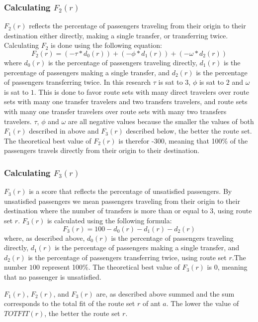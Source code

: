 \subsubsection*{Calculating $F_{2}(r)$}
\label{sec:f2}
$F_{2}(r)$ reflects the percentage of passengers traveling from their origin to their destination either directly, making a single transfer, or transferring twice. Calculating $F_{2}$ is done using the following equation: 
\newline
$$F_2(r) = (-\tau*d_0(r)) + (-\phi*d_1(r)) + (-\omega*d_2(r))$$
\newline
where $d_0(r)$ is the percentage of passengers traveling directly, $d_1(r)$ is the percentage of passengers making a single transfer, and $d_2(r)$ is the percentage of passengers transferring twice. In this research $\tau$ is sat to $3$, $\phi$ is sat to $2$ and $\omega$ is sat to $1$. This is done to favor route sets with many direct travelers over route sets with many one transfer travelers and two transfers travelers, and route sets with many one transfer travelers over route sets with many two transfers travelers. $\tau$, $\phi$ and $\omega$ are all negative values because the smaller the values of both $F_{1}(r)$ described in above and $F_{3}(r)$ described below, the better the route set. The theoretical best value of $F_{2}(r)$ is therefor -300, meaning that 100\% of the passengers travels directly from their origin to their destination. 

\subsubsection*{Calculating $F_{3}(r)$}
\label{sec:f3}
$F_3(r)$ is a score that reflects the percentage of unsatisfied passengers. By unsatisfied passengers we mean passengers traveling from their origin to their destination where the number of transfers is more than or equal to 3, using route set $r$. $F_3(r)$ is calculated using the following formula:
\newline
$$F_3(r) = 100 - d_0(r) - d_1(r) - d_2(r)$$
\newline
where, as described above, $d_0(r)$ is the percentage of passengers traveling directly, $d_1(r)$ is the percentage of passengers making a single transfer, and $d_2(r)$ is the percentage of passengers transferring twice, using route set $r$.The number $100$ represent 100\%. The theoretical best value of $F_3(r)$ is 0, meaning that no passenger is unsatisfied. 

$F_{1}(r)$, $F_{2}(r)$, and $F_{3}(r)$ are, as described above summed and the sum corresponds to the total fit of the route set $r$ of ant $a$. The lower the value of $TOTFIT(r)$, the better the route set $r$. 

